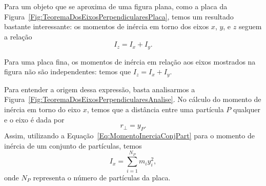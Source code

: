 
Para um objeto que se aproxima de uma figura plana, como a placa da Figura~\ref{Fig:TeoremaDosEixosPerpendicularesPlaca}, temos um resultado bastante interessante: os momentos de inércia em torno dos eixos $x$, $y$, e $z$ seguem a relação
\begin{equation}
    I_z = I_x + I_y.
\end{equation}

\begin{marginfigure}
\centering
{}
\caption{Para uma placa fina, os momentos de inércia em relação aos eixos mostrados na figura não são independentes: temos que $I_z = I_x + I_y$. \label{Fig:TeoremaDosEixosPerpendicularesPlaca}}
\end{marginfigure}

Para entender a origem dessa expressão, basta analisarmos a Figura~\ref{Fig:TeoremaDosEixosPerpendicularesAnalise}. No cálculo do momento de inércia em torno do eixo $x$, temos que a distância entre uma partícula $P$ qualquer e o eixo é dada por
\begin{equation}
    r_\perp = y_P.
\end{equation}
%
Assim, utilizando a Equação~\eqref{Eq:MomentoInerciaConjPart} para o momento de inércia de um conjunto de partículas, temos
\begin{equation}
    I_x = \sum_{i = 1}^{N_P} m_i y_i^2,
\end{equation}
%
onde $N_P$ representa o número de partículas da placa.

